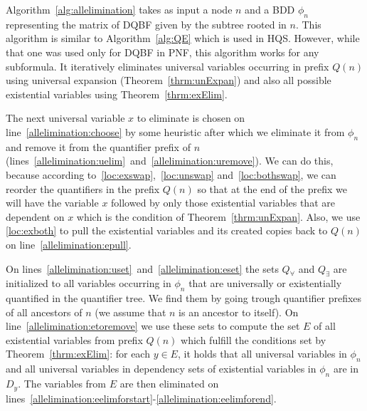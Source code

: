 \documentclass[
  digital, %
  color,
  twoside, %
  table,   %
  nolof,     %
  nolot,     %
]{fithesis3}
\theoremstyle{definition}
\theoremstyle{remark}
\newcommand{\prefix}[1]{Q({#1})}
\begin{document}
Algorithm~\ref{alg:allelimination} takes as input a node $n$ and a BDD $\phi_n$ representing the matrix of DQBF given by the subtree rooted in $n$. This algorithm is similar to Algorithm~\ref{alg:QE} which is used in HQS. However, while that one was used only for DQBF in PNF, this algorithm works for any subformula. It iteratively eliminates universal variables occurring in prefix $\prefix{n}$ using universal expansion (Theorem~\ref{thrm:unExpan}) and also all possible existential variables using Theorem~\ref{thrm:exElim}.

The next universal variable $x$ to eliminate is chosen on line~\ref{allelimination:choose} by some heuristic after which we eliminate it from $\phi_n$ and remove it from the quantifier prefix of $n$ (lines~\ref{allelimination:uelim}~and~\ref{allelimination:uremove}). We can do this, because according to~\eqref{loc:exswap},~\eqref{loc:unswap} and~\eqref{loc:bothswap}, we can reorder the quantifiers in the prefix $\prefix{n}$ so that at the end of the prefix we will have the variable $x$ followed by only those existential variables that are dependent on $x$ which is the condition of Theorem~\ref{thrm:unExpan}. Also, we use \eqref{loc:exboth} to pull the existential variables and its created copies back to $\prefix{n}$ on line~\ref{allelimination:epull}.

On lines~\ref{allelimination:uset}~and~\ref{allelimination:eset} the sets $Q_{\forall}$ and $Q_{\exists}$ are initialized to all variables occurring in $\phi_n$ that are universally or existentially quantified in the quantifier tree. We find them by going trough quantifier prefixes of all ancestors of $n$ (we assume that $n$ is an ancestor to itself). On line~\ref{allelimination:etoremove} we use these sets to compute the set $E$ of all existential variables from prefix $\prefix{n}$ which fulfill the conditions set by Theorem~\ref{thrm:exElim}: for each $y \in E$, it holds that all universal variables in $\phi_n$ and all universal variables in dependency sets of existential variables in $\phi_n$ are in $D_y$. The variables from $E$ are then eliminated on lines~\ref{allelimination:eelimforstart}-\ref{allelimination:eelimforend}.
\end{document}
